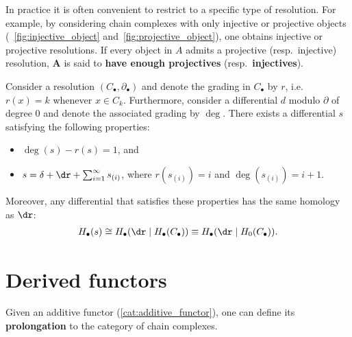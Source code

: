 	In practice it is often convenient to restrict to a specific type of resolution. For example, by considering chain complexes with only injective or projective objects (~\ref{fig:injective_object} and~\ref{fig:projective_object}), one obtains injective or projective resolutions. If every object in $A$ admits a projective (resp.~injective) resolution, $\mathbf{A}$ is said to \textbf{have enough projectives} (resp.~\textbf{injectives}).

    \begin{theorem}\label{homalg:homological_perturbation}
        Consider a resolution $(C_\bullet,\partial_\bullet)$ and denote the grading in $C_\bullet$ by $r$, i.e.~$r(x)=k$ whenever $x\in C_k$. Furthermore, consider a differential $d$ modulo $\partial$ of degree 0 and denote the associated grading by $\deg$. There exists a differential $s$ satisfying the following properties:
        \begin{itemize}
            \item $\deg(s) - r(s) = 1$, and
            \item $s = \delta + \dr + \sum_{i=1}^\infty s_{(i)}$, where $r(s_{(i)})=i$ and $\deg(s_{(i)}) = i+1$.
        \end{itemize}
        Moreover, any differential that satisfies these properties has the same homology as $\dr$:
        \begin{gather}
            H_\bullet(s)\cong H_\bullet(\dr\mid H_\bullet(C_\bullet))\equiv H_\bullet(\dr\mid H_0(C_\bullet)).
        \end{gather}
    \end{theorem}

\section{Derived functors}

	Given an additive functor (\cref{cat:additive_functor}), one can define its \textbf{prolongation} to the category of chain complexes.

